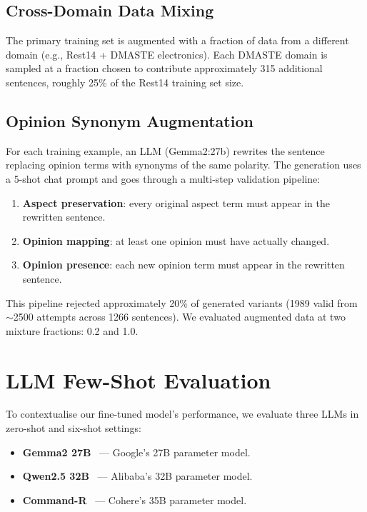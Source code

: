 \documentclass[12pt,a4paper]{report}
\begin{document}
\subsection{Cross-Domain Data Mixing}

The primary training set is augmented with a fraction of data from a different domain (e.g., Rest14 + DMASTE electronics). Each DMASTE domain is sampled at a fraction chosen to contribute approximately 315 additional sentences, roughly 25\% of the Rest14 training set size.

\subsection{Opinion Synonym Augmentation}

For each training example, an LLM (Gemma2:27b) rewrites the sentence replacing opinion terms with synonyms of the same polarity. The generation uses a 5-shot chat prompt and goes through a multi-step validation pipeline:
\begin{enumerate}
    \item \textbf{Aspect preservation}: every original aspect term must appear in the rewritten sentence.
    \item \textbf{Opinion mapping}: at least one opinion must have actually changed.
    \item \textbf{Opinion presence}: each new opinion term must appear in the rewritten sentence.
\end{enumerate}

This pipeline rejected approximately 20\% of generated variants (1989 valid from $\sim$2500 attempts across 1266 sentences). We evaluated augmented data at two mixture fractions: 0.2 and 1.0.


\section{LLM Few-Shot Evaluation}\label{sec:llm-method}

To contextualise our fine-tuned model's performance, we evaluate three LLMs in zero-shot and six-shot settings:

\begin{itemize}
    \item \textbf{Gemma2 27B}~\cite{team2024gemma} --- Google's 27B parameter model.
    \item \textbf{Qwen2.5 32B}~\cite{hui2024qwen2} --- Alibaba's 32B parameter model.
    \item \textbf{Command-R}~\cite{cohere2024commandr} --- Cohere's 35B parameter model.
\end{itemize}
\end{document}
